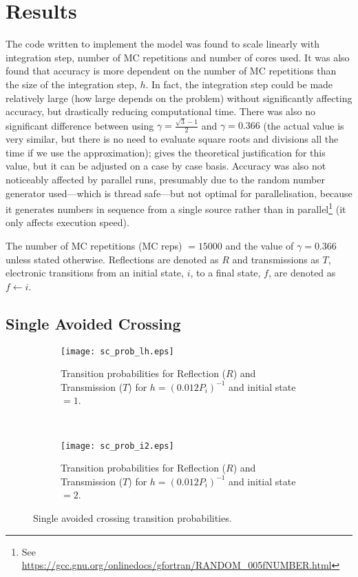\section*{Results}
%
The code written to implement the model was found to scale linearly with integration step, number of MC repetitions and number of cores used. It was also found that accuracy is more dependent on the number of MC repetitions than the size of the integration step, $ h $. In fact, the integration step could be made relatively large (how large depends on the problem) without significantly affecting accuracy, but drastically reducing computational time. There was also no significant difference between using $ \gamma = \frac{\sqrt{3}-1}{2} $ and $ \gamma = 0.366 $ (the actual value is very similar, but there is no need to evaluate square roots and divisions all the time if we use the approximation); \cite{project} gives the theoretical justification for this value, but it can be adjusted on a case by case basis. Accuracy was also not noticeably affected by parallel runs, presumably due to the random number generator used---which is thread safe---but not optimal for parallelisation, because it generates numbers in sequence from a single source rather than in parallel\footnote{See \url{https://gcc.gnu.org/onlinedocs/gfortran/RANDOM_005fNUMBER.html}} (it only affects execution speed).

The number of MC repetitions (MC reps) $ = 15000 $ and the value of $ \gamma = 0.366 $ unless stated otherwise. Reflections are denoted as $ R $ and transmissions as $ T $, electronic transitions from an initial state, $ i $, to a final state, $ f $, are denoted as $ f \leftarrow i $.
%
\subsection*{Single Avoided Crossing}
%
\begin{figure}
\begin{subfigure}[t]{0.5\textwidth}
\centering
\texttt{[image: sc\_prob\_lh.eps]}
\caption[]{Transition probabilities for Reflection ($ R $) and Transmission ($ T $) for $ h = (0.012P_{i})^{-1} $ and initial state $ = 1 $.}
\label{sumf:sci1}
\end{subfigure}
~
\begin{subfigure}[t]{0.5\textwidth}
\centering
\texttt{[image: sc\_prob\_i2.eps]}
\caption[]{Transition probabilities for Reflection ($ R $) and Transmission ($ T $) for $ h = (0.012P_{i})^{-1} $ and initial state $ = 2 $.}
\label{sumf:sci2}
\end{subfigure}
\caption[]{Single avoided crossing transition probabilities.}\label{sumf:sc}
\end{figure}


